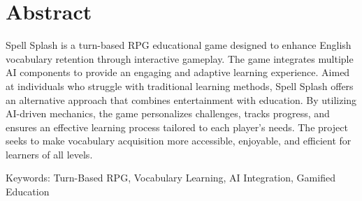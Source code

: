 \chapter*{Abstract}
\label{chap:abstract}

Spell Splash is a turn-based RPG educational game designed to enhance English vocabulary retention through interactive gameplay. The game integrates multiple AI components to provide an engaging and adaptive learning experience. Aimed at individuals who struggle with traditional learning methods, Spell Splash offers an alternative approach that combines entertainment with education. By utilizing AI-driven mechanics, the game personalizes challenges, tracks progress, and ensures an effective learning process tailored to each player’s needs. The project seeks to make vocabulary acquisition more accessible, enjoyable, and efficient for learners of all levels.

Keywords: Turn-Based RPG, Vocabulary Learning, AI Integration, Gamified Education
